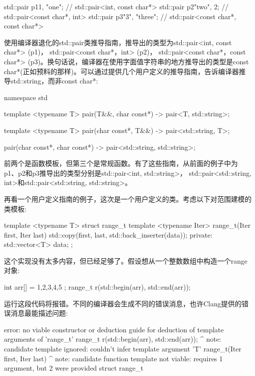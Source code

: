 \begin{cpp}
std::pair p1{1, "one"}; // std::pair<int, const char*>
std::pair p2{"two", 2}; // std::pair<const char*, int>
std::pair p3{"3", "three"};
// std::pair<const char*, const char*>
\end{cpp}

使用编译器退化的std::pair类推导指南，推导出的类型为std::pair<int, const char*> (p1)， std::pair<const char*，int> (p2)， std::pair<const char*，const char*> (p3)。换句话说，编译器在使用字面值字符串的地方推导出的类型是const char*(正如预料的那样)。可以通过提供几个用户定义的推导指南，告诉编译器推导std::string，而非const char*:

\begin{cpp}
namespace std
{
	template <typename T>
	pair(T&&, char const*) -> pair<T, std::string>;
	
	template <typename T>
	pair(char const*, T&&) -> pair<std::string, T>;
	
	pair(char const*, char const*) ->
	pair<std::string, std::string>;
}
\end{cpp}

前两个是函数模板，但第三个是常规函数。有了这些指南，从前面的例子中为p1、p2和p3推导出的类型分别是std::pair<int, std::string>， std::pair<std::string, int>和std::pair<std::string, std::string>。

再看一个用户定义指南的例子，这次是一个用户定义的类。考虑以下对范围建模的类模板:

\begin{cpp}
template <typename T>
struct range_t
{
	template <typename Iter>
	range_t(Iter first, Iter last)
	{
		std::copy(first, last, std::back_inserter(data));
	}
	private:
	std::vector<T> data;
};
\end{cpp}

这个实现没有太多内容，但已经足够了。假设想从一个整数数组中构造一个range对象:

\begin{cpp}
int arr[] = { 1,2,3,4,5 };
range_t r(std::begin(arr), std::end(arr));
\end{cpp}

运行这段代码将报错。不同的编译器会生成不同的错误消息，也许Clang提供的错误消息最能描述问题:

\begin{shell}
error: no viable constructor or deduction guide for deduction
of template arguments of 'range_t'
range_t r(std::begin(arr), std::end(arr));
         ^
note: candidate template ignored: couldn't infer template
argument 'T'
range_t(Iter first, Iter last)
         ^
note: candidate function template not viable: requires 1
argument, but 2 were provided
struct range_t
\end{shell}


